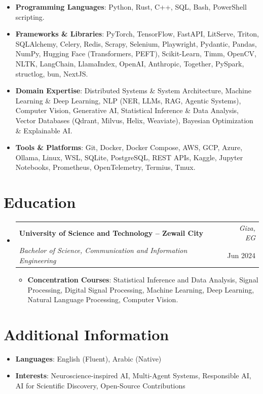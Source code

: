 \documentclass[10pt, letterpaper]{extarticle}
\makeatletter
\newcommand{\resumeItem}[1]{\item{#1}}
\newcommand{\resumeSubheading}[4]{
  \item
    \begin{tabular*}{1.0\textwidth}[t]{l@{\extracolsep{\fill}}r}
      \textbf{#1} & \textit{#4} \\
      \textit{#3} & #2 \\
    \end{tabular*}\vspace{1.5pt}
}
\makeatother
\begin{document}
\begin{itemize}[label={}, leftmargin=0in]
    \item \textbf{Programming Languages}: Python, Rust, C++, SQL, Bash, PowerShell scripting.
    \item \textbf{Frameworks \& Libraries}: PyTorch, TensorFlow, FastAPI, LitServe, Triton, SQLAlchemy, Celery, Redis, Scrapy, Selenium, Playwright, Pydantic, Pandas, NumPy, Hugging Face (Transformers, PEFT), Scikit-Learn, Timm, OpenCV, NLTK, LangChain, LlamaIndex, OpenAI, Anthropic, Together, PySpark, structlog, bun, NextJS.
    \item \textbf{Domain Expertise}: Distributed Systems \& System Architecture, Machine Learning \& Deep Learning, NLP (NER, LLMs, RAG, Agentic Systems), Computer Vision, Generative AI, Statistical Inference \& Data Analysis, Vector Databases (Qdrant, Milvus, Helix, Weaviate), Bayesian Optimization \& Explainable AI.
    \item \textbf{Tools \& Platforms}: Git, Docker, Docker Compose, AWS, GCP, Azure, Ollama, Linux, WSL, SQLite, PostgreSQL, REST APIs, Kaggle, Jupyter Notebooks, Prometheus, OpenTelemetry, Termius, Tmux.
\end{itemize}

\section{Education}

\begin{itemize}[label={}, leftmargin=0in]
    \resumeSubheading{University of Science and Technology -- Zewail City}{Jun 2024}{Bachelor of Science, Communication and Information Engineering}{Giza, EG}
    \begin{itemize}[label={--}]
      \resumeItem{\textbf{Concentration Courses}: Statistical Inference and Data Analysis, Signal Processing, Digital Signal Processing, Machine Learning, Deep Learning, Natural Language Processing, Computer Vision.}
    \end{itemize}
\end{itemize}

\section{Additional Information}
\begin{itemize}[label={}, leftmargin=0in]
    \item \textbf{Languages}: English (Fluent), Arabic (Native)
    \item \textbf{Interests}: Neuroscience-inspired AI, Multi-Agent Systems, Responsible AI, AI for Scientific Discovery, Open-Source Contributions
\end{itemize}
\end{document}
